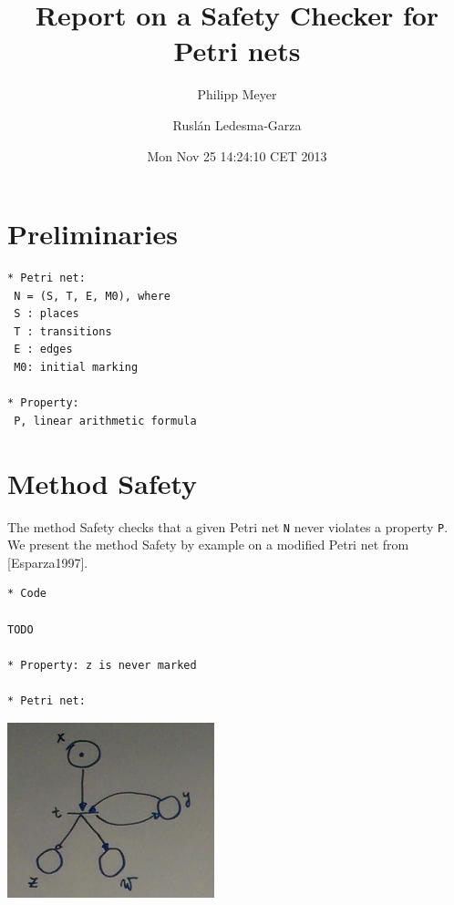 \documentclass{article}
\begin{document}
\title{Report on a Safety Checker for Petri nets}
\author{Philipp Meyer \and Rusl\'{a}n Ledesma-Garza}
\date{Mon Nov 25 14:24:10 CET 2013}



\section{Preliminaries}


\begin{verbatim}
* Petri net:
 N = (S, T, E, M0), where
 S : places
 T : transitions
 E : edges
 M0: initial marking

* Property:
 P, linear arithmetic formula
\end{verbatim}

\newpage
\section{Method Safety}

The method Safety checks that a given Petri net \verb=N= never violates a property \verb=P=.
We present the method Safety by example on a modified Petri net from [Esparza1997].

\begin{verbatim}
* Code

TODO

* Property: z is never marked

* Petri net:

\end{verbatim}

\begin{center}
  \includegraphics[width=6cm]{example-filip}
\end{center}
\end{document}
